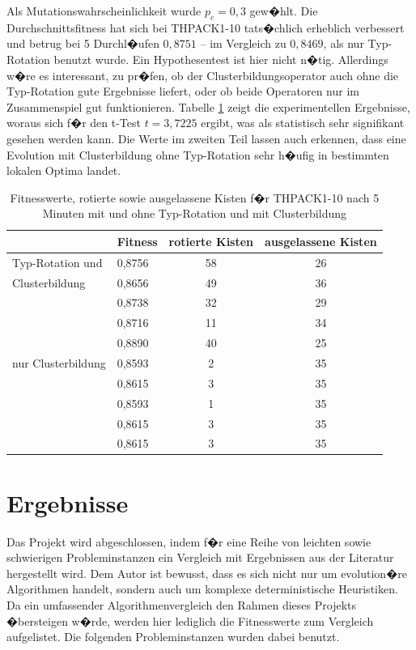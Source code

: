 \documentclass[a4paper,abstracton,12pt]{scrartcl}
\begin{document}
Als Mutationswahrscheinlichkeit wurde $p_c = 0,3$ gew�hlt. Die Durchschnittsfitness hat sich bei THPACK1-10 tats�chlich erheblich verbessert und betrug bei 5 Durchl�ufen $0,8751$ -- im Vergleich zu $0,8469$, als nur Typ-Rotation benutzt wurde. Ein Hypothesentest ist hier nicht n�tig. Allerdings w�re es interessant, zu pr�fen, ob der Clusterbildungsoperator auch ohne die Typ-Rotation gute Ergebnisse liefert, oder ob beide Operatoren nur im Zusammenspiel gut funktionieren. Tabelle \ref{tbl:stackrotationvsgrouping} zeigt die experimentellen Ergebnisse, woraus sich f�r den t-Test $t=3,7225$ ergibt, was als statistisch sehr signifikant gesehen werden kann. Die Werte im zweiten Teil lassen auch erkennen, dass eine Evolution mit Clusterbildung ohne Typ-Rotation sehr h�ufig in bestimmten lokalen Optima landet.

\begin{table}
  \caption{Fitnesswerte, rotierte sowie ausgelassene Kisten f�r THPACK1-10 nach 5 Minuten mit und ohne Typ-Rotation und mit Clusterbildung}
  \label{tbl:stackrotationvsgrouping}
	\centering
	\begin{tabular}{l|l|c|c}
	 & Fitness & rotierte Kisten & ausgelassene Kisten \\ 
	\hline
	Typ-Rotation und & 0,8756 & 58 & 26 \\ 
	Clusterbildung & 0,8656 & 49 & 36 \\ 
	 & 0,8738 & 32 & 29 \\ 
	 & 0,8716 & 11 & 34 \\ 
	 & 0,8890 & 40 & 25 \\ 
	\hline
	nur Clusterbildung & 0,8593 & 2 & 35 \\ 
	 & 0,8615 & 3 & 35 \\ 
	 & 0,8593 & 1 & 35 \\ 
	 & 0,8615 & 3 & 35 \\ 
	 & 0,8615 & 3 & 35 \\ 
	\end{tabular}
\end{table}

\section{Ergebnisse}

Das Projekt wird abgeschlossen, indem f�r eine Reihe von leichten sowie schwierigen Probleminstanzen ein Vergleich mit Ergebnissen aus der Literatur hergestellt wird. Dem Autor ist bewusst, dass es sich nicht nur um evolution�re Algorithmen handelt, sondern auch um komplexe deterministische Heuristiken. Da ein umfassender Algorithmenvergleich den Rahmen dieses Projekts �bersteigen w�rde, werden hier lediglich die Fitnesswerte zum Vergleich aufgelistet. Die folgenden Probleminstanzen wurden dabei benutzt.
\end{document}
